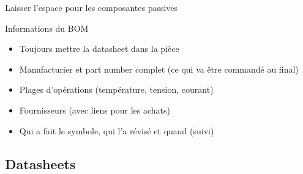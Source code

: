 \begin{frame}{Laisser l'espace pour les composantes passives}
\end{frame}


\begin{frame}{Informations du BOM}
    \begin{itemize}
        \item Toujours mettre la datasheet dans la pièce
        \item Manufacturier et part number complet (ce qui va être commandé au final)
        \item Plages d'opérations (température, tension, courant)
        \item Fournisseurs (avec liens pour les achats)
        \item Qui a fait le symbole, qui l'a révisé et quand (suivi)
    \end{itemize}
\end{frame}

\subsection{Datasheets}


